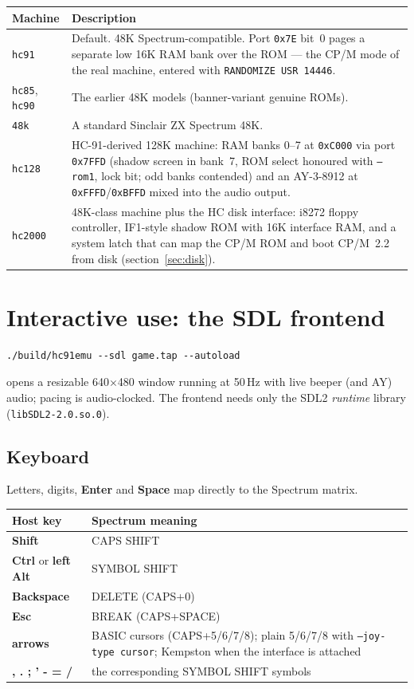 \documentclass[11pt,a4paper]{article}
\newcommand{\opt}[1]{\texttt{#1}}
\newcommand{\key}[1]{\textsf{\textbf{#1}}}
\begin{document}
\begin{tabularx}{\textwidth}{lX}
\toprule
\textbf{Machine} & \textbf{Description} \\
\midrule
\opt{hc91} & Default. 48K Spectrum-compatible. Port \texttt{0x7E}
bit~0 pages a separate low 16K RAM bank over the ROM --- the CP/M mode
of the real machine, entered with \texttt{RANDOMIZE USR 14446}. \\
\opt{hc85}, \opt{hc90} & The earlier 48K models (banner-variant
genuine ROMs). \\
\opt{48k} & A standard Sinclair ZX Spectrum 48K. \\
\opt{hc128} & HC-91-derived 128K machine: RAM banks 0--7 at
\texttt{0xC000} via port \texttt{0x7FFD} (shadow screen in bank~7, ROM
select honoured with \opt{--rom1}, lock bit; odd banks contended) and
an AY-3-8912 at \texttt{0xFFFD}/\texttt{0xBFFD} mixed into the audio
output. \\
\opt{hc2000} & 48K-class machine plus the HC disk interface: i8272
floppy controller, IF1-style shadow ROM with 16K interface RAM, and a
system latch that can map the CP/M ROM and boot CP/M~2.2 from disk
(section~\ref{sec:disk}). \\
\bottomrule
\end{tabularx}

\section{Interactive use: the SDL frontend}

\begin{Verbatim}
./build/hc91emu --sdl game.tap --autoload
\end{Verbatim}

opens a resizable 640$\times$480 window running at 50\,Hz with live
beeper (and AY) audio; pacing is audio-clocked. The frontend needs
only the SDL2 \emph{runtime} library (\texttt{libSDL2-2.0.so.0}).

\subsection{Keyboard}

Letters, digits, \key{Enter} and \key{Space} map directly to the
Spectrum matrix.

\begin{tabularx}{\textwidth}{lX}
\toprule
\textbf{Host key} & \textbf{Spectrum meaning} \\
\midrule
\key{Shift} & CAPS SHIFT \\
\key{Ctrl} or \key{left Alt} & SYMBOL SHIFT \\
\key{Backspace} & DELETE (CAPS+0) \\
\key{Esc} & BREAK (CAPS+SPACE) \\
\key{arrows} & BASIC cursors (CAPS+5/6/7/8); plain 5/6/7/8 with
\opt{--joy-type cursor}; Kempston when the interface is attached \\
\key{, . ; ' - = /} & the corresponding SYMBOL SHIFT symbols \\
\bottomrule
\end{tabularx}
\end{document}
